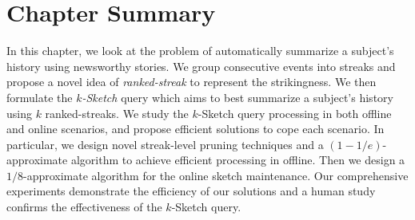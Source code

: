 \section{Chapter Summary} \label{sec:conclusion}
In this chapter, we look at the problem of automatically summarize 
a subject's history using newsworthy stories.
We group consecutive events into streaks and propose a novel idea of \emph{ranked-streak} to represent the strikingness.
We then formulate the \emph{$k$-Sketch} query which aims to best summarize a subject's history using $k$ ranked-streaks.
We study the $k$-Sketch query processing in both offline and online scenarios,
and propose efficient solutions to cope each scenario. In particular, we design novel streak-level pruning techniques and a $(1-1/e)$-approximate algorithm to achieve efficient processing in offline. Then we design a $1/8$-approximate algorithm for the online sketch maintenance.
Our comprehensive experiments demonstrate the efficiency of our solutions and a human study confirms the effectiveness of the $k$-Sketch query.

